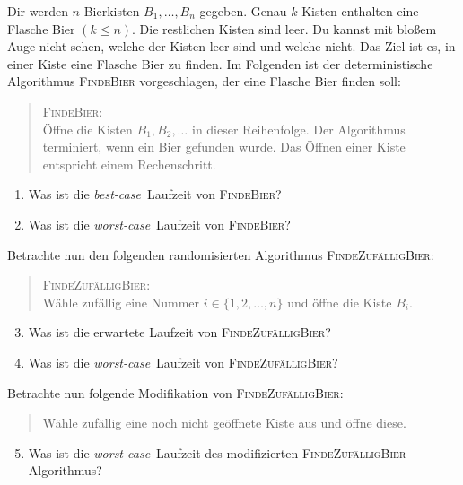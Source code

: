 \documentclass{uebung_cs}
\begin{document}
\begin{aufgabe}[Bierkisten]
	Dir werden $n$ Bierkisten $B_1,\dots,B_n$ gegeben. Genau $k$ Kisten enthalten eine Flasche Bier $(k \leq n)$. Die restlichen Kisten sind leer. Du kannst mit bloßem Auge nicht sehen, welche der Kisten leer sind und welche nicht. Das Ziel ist es, in einer Kiste eine Flasche Bier zu finden. Im Folgenden ist der deterministische Algorithmus \textsc{FindeBier} vorgeschlagen, der eine Flasche Bier finden soll: 
	\begin{quote}
		\textsc{FindeBier}:\\
		Öffne die Kisten $B_1,B_2,\dots$ in dieser Reihenfolge. Der Algorithmus terminiert, wenn ein Bier gefunden wurde. Das Öffnen einer Kiste entspricht einem Rechenschritt.
	\end{quote}
	
	\begin{enumerate}
		\item Was ist die \textit{best-case}~Laufzeit von \textsc{FindeBier}?\\
		\item Was ist die \textit{worst-case}~Laufzeit von \textsc{FindeBier}?\\
	\end{enumerate}
	
	Betrachte nun den folgenden randomisierten Algorithmus \textsc{FindeZufälligBier}:
		\begin{quote}
			\textsc{FindeZufälligBier}:\\
			Wähle zufällig eine Nummer $i \in \{1,2,\dots,n\}$ und öffne die Kiste $B_i$.
		\end{quote}		 
		
	\begin{enumerate}
		\setcounter{enumi}{2}
		\item Was ist die erwartete Laufzeit von \textsc{FindeZufälligBier}?\\
		\item Was ist die \textit{worst-case}~Laufzeit von \textsc{FindeZufälligBier}?\\
	\end{enumerate}
	
	Betrachte nun folgende Modifikation von \textsc{FindeZufälligBier}: 
	\begin{quote}
		Wähle zufällig eine noch nicht geöffnete Kiste aus und öffne diese.	
	\end{quote}	
	
	\begin{enumerate}
		\setcounter{enumi}{4}
		\item Was ist die \textit{worst-case}~Laufzeit des modifizierten \textsc{FindeZufälligBier} Algorithmus?\\
	\end{enumerate}			
		

\end{aufgabe}
\end{document}
